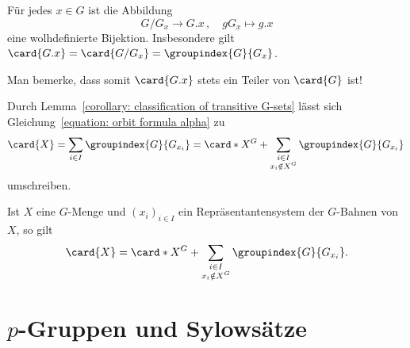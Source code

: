 \begin{corollary}
  \label{corollary: classification of transitive G-sets}
  Für jedes $x \in G$ ist die Abbildung
  \[
            G/G_x
    \to     G.x \,,
    \quad   g G_x
    \mapsto g.x
  \]
  eine wolhdefinierte Bijektion.
  Insbesondere gilt $\card{G.x} = \card{G/G_x} = \groupindex{G}{G_x}$.
\end{corollary}

\begin{remark}
  Man bemerke, dass somit $\card{G.x}$ stets ein Teiler von $\card{G}$ ist!
\end{remark}


Durch Lemma~\ref{corollary: classification of transitive G-sets} lässt sich Gleichung~\eqref{equation: orbit formula alpha} zu
\[
    \card{X}
  = \sum_{i \in I} \groupindex{G}{G_{x_i}}
  = \card*{X^G} + \sum_{\substack{i \in I \\ x_i \notin X^G}} \groupindex{G}{G_{x_i}} \,
\]
umschreiben.

\begin{corollary}[Bahnenformel]
  Ist $X$ eine $G$-Menge und $(x_i)_{i \in I}$ ein Repräsentantensystem der $G$-Bahnen von $X$, so gilt
  \[
      \card{X}
    =   \card*{X^G}
      + \sum_{\substack{i \in I \\ x_i \notin X^G}} \groupindex{G}{G_{x_i}}.
  \]
\end{corollary}










\pagebreak










\section{\texorpdfstring{$p$}{p}-Gruppen und Sylowsätze}

